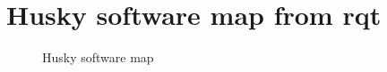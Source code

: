\appendix

\chapter{Husky software map from rqt} \label{Appendix:HuskySWmap}
\begin{figure}[H]
    \centering
    
    \caption{Husky software map}
    \label{fig:HuskySW}
\end{figure}